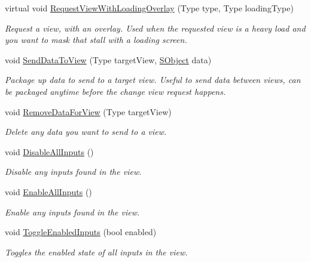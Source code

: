 \begin{DoxyCompactItemize}
virtual void \hyperlink{class_scaffolding_1_1_abstract_view_a4fce5dc780e682a9c32068dee4a4d58e}{Request\-View\-With\-Loading\-Overlay} (Type type, Type loading\-Type)
\begin{DoxyCompactList}\small\item\em Request a view, with an overlay. Used when the requested view is a heavy load and you want to mask that stall with a loading screen. \end{DoxyCompactList}\item 
void \hyperlink{class_scaffolding_1_1_abstract_view_a5676805d5374e27b0903a49fece06021}{Send\-Data\-To\-View} (Type target\-View, \hyperlink{class_scaffolding_1_1_s_object}{S\-Object} data)
\begin{DoxyCompactList}\small\item\em Package up data to send to a target view. Useful to send data between views, can be packaged anytime before the change view request happens. \end{DoxyCompactList}\item 
void \hyperlink{class_scaffolding_1_1_abstract_view_ac150377c429c981707547230cf2ccb73}{Remove\-Data\-For\-View} (Type target\-View)
\begin{DoxyCompactList}\small\item\em Delete any data you want to send to a view. \end{DoxyCompactList}\item 
void \hyperlink{class_scaffolding_1_1_abstract_view_a1bb34cd891cb97082030215fdb8b8794}{Disable\-All\-Inputs} ()
\begin{DoxyCompactList}\small\item\em Disable any inputs found in the view. \end{DoxyCompactList}\item 
void \hyperlink{class_scaffolding_1_1_abstract_view_ae550b6838501b3c2e3751535059c478e}{Enable\-All\-Inputs} ()
\begin{DoxyCompactList}\small\item\em Enable any inputs found in the view. \end{DoxyCompactList}\item 
void \hyperlink{class_scaffolding_1_1_abstract_view_a5e6cdf214eaa49da7ef180c6874353b0}{Toggle\-Enabled\-Inputs} (bool enabled)
\begin{DoxyCompactList}\small\item\em Toggles the enabled state of all inputs in the view. \end{DoxyCompactList}\end{DoxyCompactItemize}
